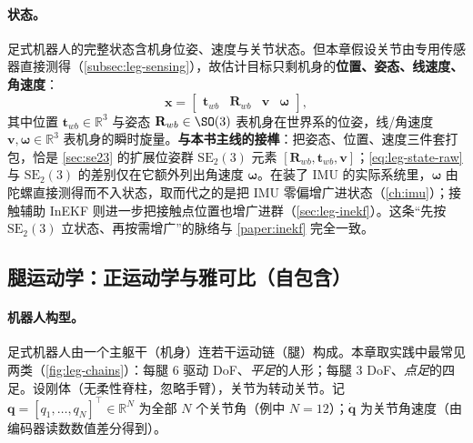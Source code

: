 \paragraph{状态。}
足式机器人的完整状态含机身位姿、速度与关节状态。但本章假设关节由专用传感器直接测得（\cref{subsec:leg-sensing}），故估计目标只剩机身的\textbf{位置、姿态、线速度、角速度}：
\begin{equation}
  \mathbf{x}=\begin{bmatrix}\mathbf{t}_{wb} & \mathbf{R}_{wb} & \mathbf{v} & \boldsymbol{\omega}\end{bmatrix},
  \label{eq:leg-state-raw}
\end{equation}
其中位置 $\mathbf{t}_{wb}\in\mathbb{R}^3$ 与姿态 $\mathbf{R}_{wb}\in\SO(3)$ 表机身在世界系的位姿，线/角速度 $\mathbf{v},\boldsymbol{\omega}\in\mathbb{R}^3$ 表机身的瞬时旋量。\textbf{与本书主线的接榫}：把姿态、位置、速度三件套打包，恰是 \cref{sec:se23} 的扩展位姿群 $\mathrm{SE}_2(3)$ 元素 $[\mathbf{R}_{wb},\mathbf{t}_{wb},\mathbf{v}]$；\cref{eq:leg-state-raw} 与 $\mathrm{SE}_2(3)$ 的差别仅在它额外列出角速度 $\boldsymbol{\omega}$。在装了 IMU 的实际系统里，$\boldsymbol{\omega}$ 由陀螺直接测得而不入状态，取而代之的是把 IMU 零偏增广进状态（\cref{ch:imu}）；接触辅助 InEKF 则进一步把接触点位置也增广进群（\cref{sec:leg-inekf}）。这条“先按 $\mathrm{SE}_2(3)$ 立状态、再按需增广”的脉络与 \cref{paper:inekf} 完全一致。

\subsection{腿运动学：正运动学与雅可比（自包含）}
\label{subsec:leg-fk}

\paragraph{机器人构型。}
足式机器人由一个主躯干（机身）连若干运动链（腿）构成。本章取实践中最常见两类（\cref{fig:leg-chains}）：每腿 $6$ 驱动 DoF、\emph{平足}的人形；每腿 $3$ DoF、\emph{点足}的四足。设刚体（无柔性脊柱，忽略手臂），关节为转动关节。记 $\mathbf{q}=[q_1,\dots,q_N]^\top\in\mathbb{R}^N$ 为全部 $N$ 个关节角（例中 $N{=}12$）；$\dot{\mathbf{q}}$ 为关节角速度（由编码器读数数值差分得到）。

